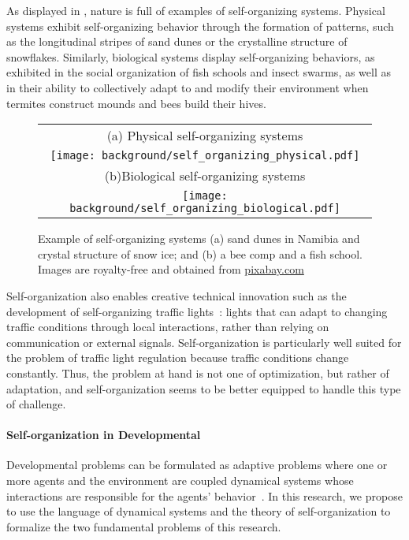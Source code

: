 As displayed in , nature is full of examples of self-organizing systems. Physical systems exhibit self-organizing behavior through the formation of patterns, such as the longitudinal stripes of sand dunes or the crystalline structure of snowflakes. Similarly, biological systems display self-organizing behaviors\citep{camazine2001self-organization}, as exhibited in the social organization of fish schools and insect swarms, as well as in their ability to collectively adapt to and modify their environment when termites construct mounds and bees build their hives.
%
\begin{figure}[!h]
\small
\centering
\begin{tabular}{c}
	(a) Physical self-organizing systems\\
	\texttt{[image: background/self\_organizing\_physical.pdf]}\\
	(b)Biological self-organizing systems\\
	\texttt{[image: background/self\_organizing\_biological.pdf]}
\end{tabular}
\caption{Example of self-organizing systems (a) sand dunes in Namibia and crystal structure of snow ice; and (b) a bee comp and a fish school. Images are royalty-free and obtained from \url{pixabay.com}}
\label{fig:example_self_org}	
\end{figure}

Self-organization also enables creative technical innovation such as the development of self-organizing traffic lights~\citep{ferreira2010self-organized}: lights that can adapt to changing traffic conditions through local interactions, rather than relying on communication or external signals. Self-organization is particularly well suited for the problem of traffic light regulation because traffic conditions change constantly. Thus, the problem at hand is not one of optimization, but rather of adaptation, and self-organization seems to be better equipped to handle this type of challenge.

\paragraph{Self-organization in Developmental \ai}

Developmental \ai problems can be formulated as adaptive problems where one or more agents and the environment are coupled dynamical systems whose interactions are responsible for the agents' behavior~\citep{beer1995dynamical}. In this research, we propose to use the language of dynamical systems and the theory of self-organization to formalize the two fundamental problems of this research.

